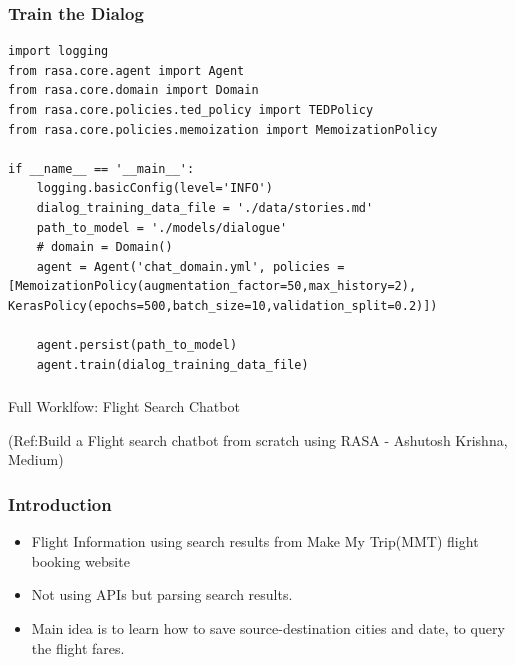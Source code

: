  \begin{frame}[fragile]\frametitle{Train the Dialog}
\begin{lstlisting}
import logging
from rasa.core.agent import Agent
from rasa.core.domain import Domain
from rasa.core.policies.ted_policy import TEDPolicy
from rasa.core.policies.memoization import MemoizationPolicy

if __name__ == '__main__':
    logging.basicConfig(level='INFO')
    dialog_training_data_file = './data/stories.md'
    path_to_model = './models/dialogue'
    # domain = Domain()
    agent = Agent('chat_domain.yml', policies = [MemoizationPolicy(augmentation_factor=50,max_history=2), KerasPolicy(epochs=500,batch_size=10,validation_split=0.2)])

    agent.persist(path_to_model)
    agent.train(dialog_training_data_file)
\end{lstlisting}
\end{frame}

\begin{frame}[fragile]\frametitle{}
\begin{center}
{\Large Full Worklfow: Flight Search Chatbot}
\end{center}

{\tiny (Ref:Build a Flight search chatbot from scratch using RASA - Ashutosh Krishna, Medium)}
\end{frame}

 \begin{frame}[fragile]\frametitle{Introduction}
\begin{itemize}
\item Flight Information using search results from Make My Trip(MMT) flight booking website	
\item Not using APIs but parsing search results.
\item Main idea is to learn how to save source-destination cities and date, to query the flight fares.
\end{itemize}

\end{frame}

